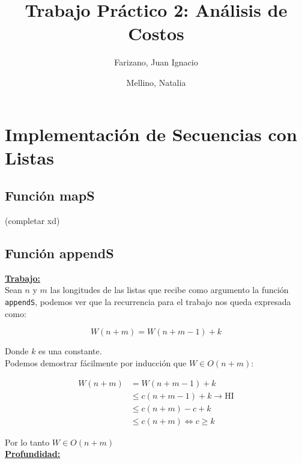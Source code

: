 \documentclass[11pt]{article}
\title{Trabajo Práctico 2: Análisis de Costos}
\author{Farizano, Juan Ignacio \and Mellino, Natalia}
\date{}
\begin{document}
\maketitle

\section*{Implementación de Secuencias con Listas}


\subsection*{Función mapS}

(completar xd)


\subsection*{Función appendS}

\textbf{\underline{Trabajo:}} \\

Sean $n$ y $m$ las longitudes de las listas que recibe como argumento
la función \texttt{appendS}, podemos ver que la recurrencia para el
trabajo nos queda expresada como:

\begin{equation*}
    W(n + m) = W(n + m - 1) + k
\end{equation*}

Donde $k$ es una constante. \\

Podemos demostrar fácilmente por inducción que $W \in O(n+m)$:

\begin{align*}
    W(n + m) & = W(n + m - 1) + k \\
             & \leq c(n + m - 1) + k \rightarrow \text{HI}\\
             & \leq c(n + m) - c + k \\
             & \leq c(n + m) \iff c \geq k
\end{align*}

Por lo tanto $W \in O(n + m)$ \\

\textbf{\underline{Profundidad:}} \\
\end{document}
